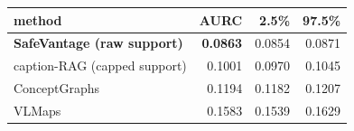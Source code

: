 \begin{tabular}{lrrr}
\toprule
method & AURC & 2.5\% & 97.5\% \\
\midrule
\textbf{SafeVantage (raw support)} & \textbf{0.0863} & 0.0854 & 0.0871 \\
caption-RAG (capped support) & 0.1001 & 0.0970 & 0.1045 \\
ConceptGraphs & 0.1194 & 0.1182 & 0.1207 \\
VLMaps & 0.1583 & 0.1539 & 0.1629 \\
\bottomrule
\end{tabular}
